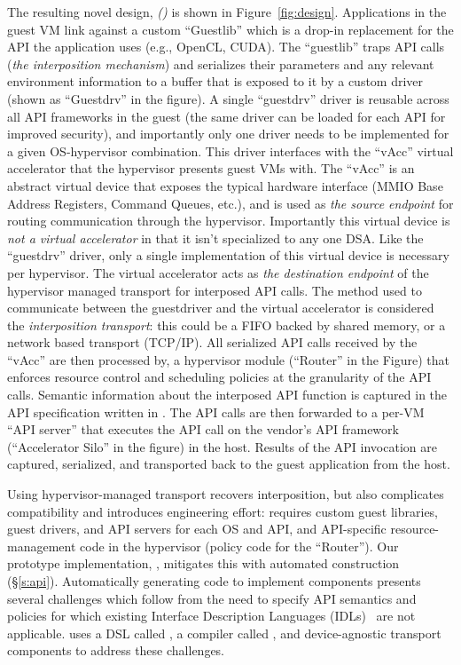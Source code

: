 The resulting novel design, \emph{\hirafull (\hira)} is shown in
Figure~\ref{fig:design}. Applications in the guest VM link against a custom
``Guestlib'' which is a drop-in replacement for the API the application uses
(e.g., OpenCL, CUDA). The ``guestlib'' traps API calls (\emph{the interposition
mechanism}) and serializes their parameters and any relevant environment
information to a buffer that is exposed to it by a custom driver (shown as
``Guestdrv'' in the figure). A single ``guestdrv'' driver is reusable across
all API frameworks in the guest (the same driver can be loaded for each API
for improved security), and importantly only one driver needs to be
implemented for a given OS-hypervisor combination. This driver interfaces with
the ``vAcc'' virtual accelerator that the hypervisor presents guest VMs with.
The ``vAcc'' is an abstract virtual device that exposes the typical hardware
interface (MMIO Base Address Registers, Command Queues, etc.), and is used as
\emph{the source endpoint} for routing communication through the hypervisor.
Importantly this virtual device is \emph{not a virtual accelerator} in that it
isn't specialized to any one DSA. Like the ``guestdrv'' driver, only a single
implementation of this virtual device is necessary per hypervisor. The virtual
accelerator acts as \emph{the destination endpoint} of the hypervisor managed
transport for interposed API calls. The method used to communicate between the
guestdriver and the virtual accelerator is considered the \emph{interposition
transport}: this could be a FIFO backed by shared memory, or a network based
transport (TCP/IP). All serialized API calls received by the ``vAcc'' are then
processed by, a hypervisor module (``Router'' in the Figure) that enforces
resource control and scheduling policies at the granularity of the API calls.
Semantic information about the interposed API function is captured in the API
specification written in \lapis. The API calls are then forwarded to a per-VM
``API server'' that executes the API call on the vendor's API framework
(``Accelerator Silo'' in the figure) in the host. Results of the API
invocation are captured, serialized, and transported back to the guest application from the host.

Using hypervisor-managed transport recovers interposition, but also complicates
compatibility and introduces engineering effort: \hira requires custom guest
libraries, guest drivers, and API servers for each OS and API, and
API-specific resource-management code in the hypervisor (policy code for the
``Router''). Our prototype implementation, \AvA, mitigates this with automated
construction (\S\ref{s:api}). Automatically generating code to implement \hira
components presents several challenges which follow from the need to specify
API semantics and policies for which existing Interface Description Languages
(IDLs)~\cite{Lamb1987,MSIDL} are not applicable. \AvA uses a DSL called \Lapis,
a compiler called \CAvA, and device-agnostic transport components to address
these challenges.

